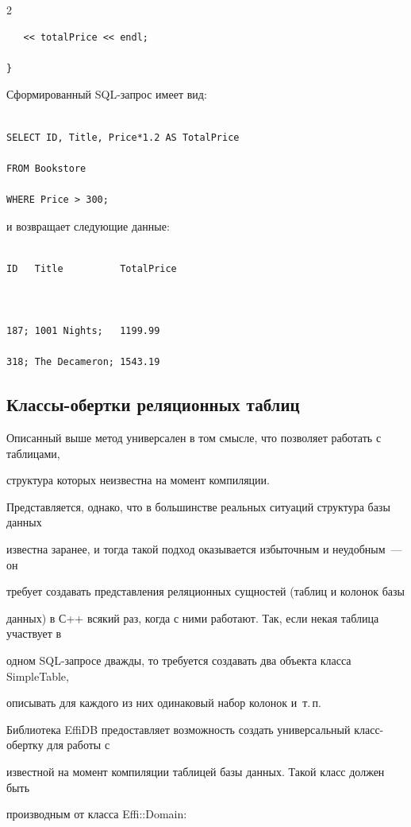 \begin{multicols}{2}
\begin{verbatim}
   << totalPrice << endl;

}

\end{verbatim}



Сформированный SQL-запрос имеет вид:

\begin{verbatim}

SELECT ID, Title, Price*1.2 AS TotalPrice

FROM Bookstore

WHERE Price > 300;

\end{verbatim}

и возвращает следующие данные: 

\begin{verbatim}

ID   Title          TotalPrice



187; 1001 Nights;   1199.99

318; The Decameron; 1543.19

\end{verbatim}



\subsection{Классы-обертки реляционных таблиц} %



Описанный выше метод универсален в том смысле, что позволяет работать с таблицами, 

структура которых неизвестна на момент компиляции.



Представляется, однако, что в большинстве реальных ситуаций структура базы данных 

известна заранее, и тогда такой подход оказывается избыточным и неудобным~--- он 

требует создавать пред\-став\-ле\-ния реляционных сущностей (таблиц и колонок базы 

данных) в С++ всякий раз, когда с ними работают. Так, если некая таблица участвует в 

одном SQL-за\-про\-се дважды, то требуется создавать два объекта класса {\sf SimpleTable}, 

описывать для каждого из них одинаковый набор колонок и~т.\,п. 



Библиотека EffiDB предоставляет возможность создать универсальный класс-оберт\-ку для работы с 

известной на момент компиляции таблицей базы данных. Такой класс должен быть 

производным от класса {\sf Effi::Domain}: 

\end{multicols}



